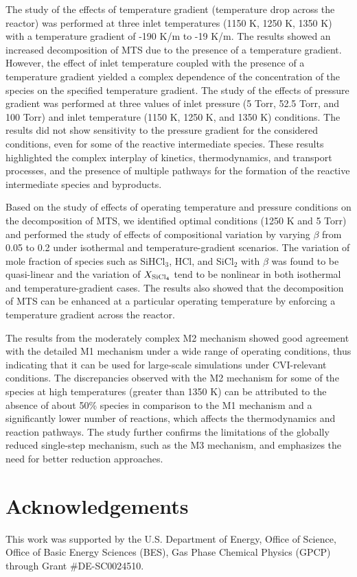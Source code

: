\documentclass[final, letterpaper, square, comma, numbers, sort&compress]{elsarticle}
\begin{document}
The study of the effects of temperature gradient (temperature drop across the reactor) was performed at three inlet temperatures (1150 K, 1250 K, 1350 K) with a temperature gradient of -190 K/m to -19 K/m. The results showed an increased decomposition of MTS due to the presence of a temperature gradient. However, the effect of inlet temperature coupled with the presence of a temperature gradient yielded a complex dependence of the concentration of the species on the specified temperature gradient. The study of the effects of pressure gradient was performed at three values of inlet pressure (5 Torr, 52.5 Torr, and 100 Torr) and inlet temperature (1150 K, 1250 K, and 1350 K) conditions. The results did not show sensitivity to the pressure gradient for the considered conditions, even for some of the reactive intermediate species. These results highlighted the complex interplay of kinetics, thermodynamics, and transport processes, and the presence of multiple pathways for the formation of the reactive intermediate species and byproducts.

Based on the study of effects of operating temperature and pressure conditions on the decomposition of MTS, we identified optimal conditions (1250 K and 5 Torr) and performed the study of effects of compositional variation by varying $\beta$ from 0.05 to 0.2 under isothermal and temperature-gradient scenarios. The variation of mole fraction of species such as SiHCl$_3$, HCl, and SiCl$_2$ with $\beta$ was found to be quasi-linear and the variation of $X_{\rm SiCl_4}$ tend to be nonlinear in both isothermal and temperature-gradient cases. The results also showed that the decomposition of MTS can be enhanced at a particular operating temperature by enforcing a temperature gradient across the reactor.

The results from the moderately complex M2 mechanism showed good agreement with the detailed M1 mechanism under a wide range of operating conditions, thus indicating that it can be used for large-scale simulations under CVI-relevant conditions. The discrepancies observed with the M2 mechanism for some of the species at high temperatures (greater than 1350 K) can be attributed to the absence of about 50\% species in comparison to the M1 mechanism and a significantly lower number of reactions, which affects the thermodynamics and reaction pathways. The study further confirms the limitations of the globally reduced single-step mechanism, such as the M3 mechanism, and emphasizes the need for better reduction approaches.

\section*{Acknowledgements}
This work was supported by the U.S. Department of Energy, Office of Science, Office of Basic Energy Sciences (BES), Gas Phase Chemical Physics (GPCP) through Grant \#DE-SC0024510.



\end{document}
